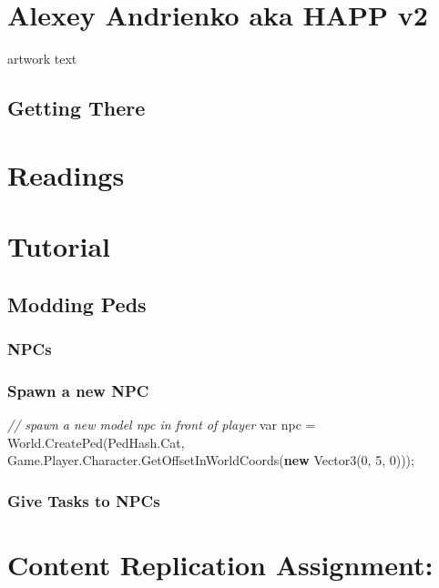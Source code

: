 \documentclass[
  openany]{book}
\newenvironment{Shaded}{\begin{snugshade}}{\end{snugshade}}
\newcommand{\CommentTok}[1]{\textcolor[rgb]{0.56,0.35,0.01}{\textit{#1}}}
\newcommand{\DataTypeTok}[1]{\textcolor[rgb]{0.13,0.29,0.53}{#1}}
\newcommand{\DecValTok}[1]{\textcolor[rgb]{0.00,0.00,0.81}{#1}}
\newcommand{\FunctionTok}[1]{\textcolor[rgb]{0.00,0.00,0.00}{#1}}
\newcommand{\KeywordTok}[1]{\textcolor[rgb]{0.13,0.29,0.53}{\textbf{#1}}}
\newcommand{\NormalTok}[1]{#1}
\begin{document}
\hypertarget{alexey-andrienko-aka-happ-v2}{%
\section{Alexey Andrienko aka HAPP v2}\label{alexey-andrienko-aka-happ-v2}}

artwork text

\hypertarget{getting-there-6}{%
\subsection{Getting There}\label{getting-there-6}}

\hypertarget{readings-4}{%
\section{Readings}\label{readings-4}}

\hypertarget{tutorial-4}{%
\section{Tutorial}\label{tutorial-4}}

\hypertarget{modding-peds}{%
\subsection{Modding Peds}\label{modding-peds}}

\hypertarget{npcs}{%
\subsubsection{NPCs}\label{npcs}}

\hypertarget{spawn-a-new-npc}{%
\subsubsection{Spawn a new NPC}\label{spawn-a-new-npc}}

\begin{Shaded}
\begin{Highlighting}[]
\CommentTok{// spawn a new model npc in front of player}
\DataTypeTok{var}\NormalTok{ npc = World.}\FunctionTok{CreatePed}\NormalTok{(PedHash.}\FunctionTok{Cat}\NormalTok{, Game.}\FunctionTok{Player}\NormalTok{.}\FunctionTok{Character}\NormalTok{.}\FunctionTok{GetOffsetInWorldCoords}\NormalTok{(}\KeywordTok{new} \FunctionTok{Vector3}\NormalTok{(}\DecValTok{0}\NormalTok{, }\DecValTok{5}\NormalTok{, }\DecValTok{0}\NormalTok{))); }
\end{Highlighting}
\end{Shaded}

\hypertarget{give-tasks-to-npcs}{%
\subsubsection{Give Tasks to NPCs}\label{give-tasks-to-npcs}}

\hypertarget{content-replication-assignment-4}{%
\section{Content Replication Assignment:}\label{content-replication-assignment-4}}
\end{document}
